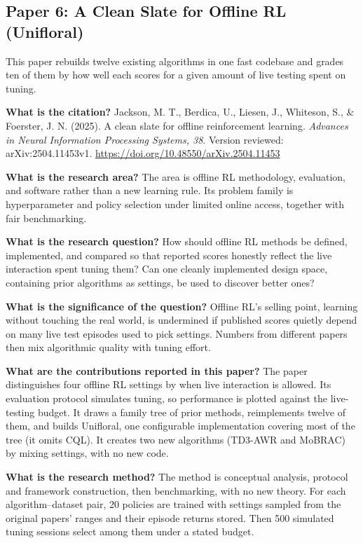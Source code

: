 \documentclass[11pt]{article}
\newcommand{\paper}[1]{\subsection*{#1}}
\newcommand{\q}[2]{\item \textbf{#1} #2}
\begin{document}
\paper{Paper 6: A Clean Slate for Offline RL (Unifloral)}
This paper rebuilds twelve existing algorithms in one fast codebase and grades ten of them by how well each scores for a given amount of live testing spent on tuning.
\begin{qna}

\q{What is the citation?}
Jackson, M. T., Berdica, U., Liesen, J., Whiteson, S., \& Foerster, J. N. (2025). A clean slate for offline reinforcement learning. \emph{Advances in Neural Information Processing Systems, 38}. Version reviewed: arXiv:2504.11453v1. \url{https://doi.org/10.48550/arXiv.2504.11453}

\q{What is the research area?}
The area is offline RL methodology, evaluation, and software rather than a new learning rule. Its problem family is hyperparameter and policy selection under limited online access, together with fair benchmarking.

\q{What is the research question?}
How should offline RL methods be defined, implemented, and compared so that reported scores honestly reflect the live interaction spent tuning them? Can one cleanly implemented design space, containing prior algorithms as settings, be used to discover better ones?

\q{What is the significance of the question?}
Offline RL's selling point, learning without touching the real world, is undermined if published scores quietly depend on many live test episodes used to pick settings. Numbers from different papers then mix algorithmic quality with tuning effort.

\q{What are the contributions reported in this paper?}
The paper distinguishes four offline RL settings by when live interaction is allowed. Its evaluation protocol simulates tuning, so performance is plotted against the live-testing budget. It draws a family tree of prior methods, reimplements twelve of them, and builds Unifloral, one configurable implementation covering most of the tree (it omits CQL). It creates two new algorithms (TD3-AWR and MoBRAC) by mixing settings, with no new code.

\q{What is the research method?}
The method is conceptual analysis, protocol and framework construction, then benchmarking, with no new theory. For each algorithm--dataset pair, 20 policies are trained with settings sampled from the original papers' ranges and their episode returns stored. Then 500 simulated tuning sessions select among them under a stated budget.


\end{qna}
\end{document}
